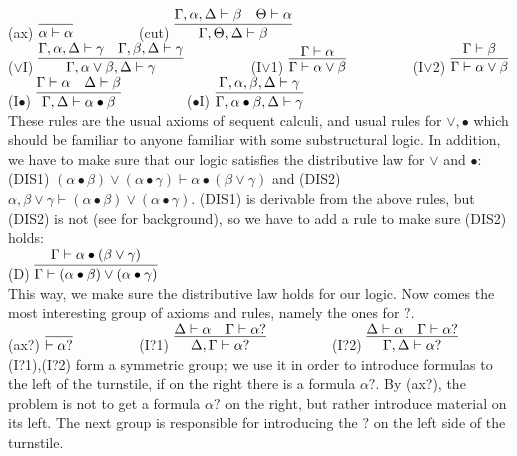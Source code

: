 \documentclass{eptcs}
\begin{document}
(ax) $\infer{\alpha\vdash\alpha}{}$
$\qquad\qquad$ 
(cut) $\infer{\Gamma,\Theta,\Delta\vdash \beta}
{\Gamma,\alpha,\Delta\vdash \beta & \Theta\vdash\alpha}$
\\

($\vee$I) $\infer{\Gamma,\alpha\vee\beta,\Delta\vdash\gamma}
{\Gamma,\alpha,\Delta\vdash \gamma & \Gamma,\beta,\Delta\vdash\gamma}$
$\qquad\qquad$ (I$\vee$1) $\infer{\Gamma\vdash \alpha\vee\beta}{\Gamma\vdash \alpha}$
$\qquad\qquad$
(I$\vee$2) $\infer{\Gamma\vdash \alpha\vee\beta}{\Gamma\vdash \beta}$
\\

(I$\bullet$) $\infer{\Gamma,\Delta\vdash \alpha\bullet\beta}
{\Gamma\vdash \alpha & \Delta\vdash \beta}$
$\qquad\qquad$
($\bullet$I) $\infer{\Gamma,\alpha\bullet\beta,\Delta \vdash \gamma}
{\Gamma,\alpha,\beta,\Delta\vdash \gamma}$
\\

These rules are the usual axioms of sequent calculi, and usual rules for
$\vee,\bullet$ which should be familiar to anyone familiar with some 
substructural logic. In addition, we have to make sure that our logic
satisfies the distributive law for $\vee$ and $\bullet$: 
(DIS1) $(\alpha\bullet\beta)\vee(\alpha\bullet\gamma)
\vdash\alpha\bullet(\beta\vee\gamma)$
and
(DIS2) $\alpha,\beta\vee\gamma\vdash (\alpha\bullet\beta)\vee(\alpha\bullet\gamma)$.
(DIS1) is derivable from
the above rules, but (DIS2) is not (see \cite{restall:introduction}
for background), so 
we have to add a rule to make sure (DIS2) holds:
\\

(D) $\infer{\Gamma\vdash (\alpha\bullet\beta)\vee(\alpha\bullet\gamma)}
{\Gamma\vdash \alpha\bullet(\beta\vee\gamma)}$
\\

This way, we make sure the distributive law holds for our logic.
Now comes the most interesting group of axioms and rules, namely the ones for
$?$. 
\\

(ax?) $\infer{\vdash \alpha?}{}$
$\qquad\qquad$
(I?1) $\infer{\Delta,\Gamma\vdash \alpha?}
{\Delta\vdash\alpha & \Gamma\vdash \alpha?}$
$\qquad\qquad$
(I?2) $\infer{\Gamma,\Delta\vdash \alpha?}
{\Delta\vdash\alpha & \Gamma\vdash \alpha?}$
\\

(I?1),(I?2) form a symmetric group; we use 
it in order to introduce formulas to the
left of the turnstile, if on the right there is a formula $\alpha?$. By 
(ax?), the problem is not to get a formula $\alpha?$ 
on the right, but rather introduce
material on its left. The next group is responsible for introducing
the $?$ on the left side of the turnstile.
\\
\end{document}
